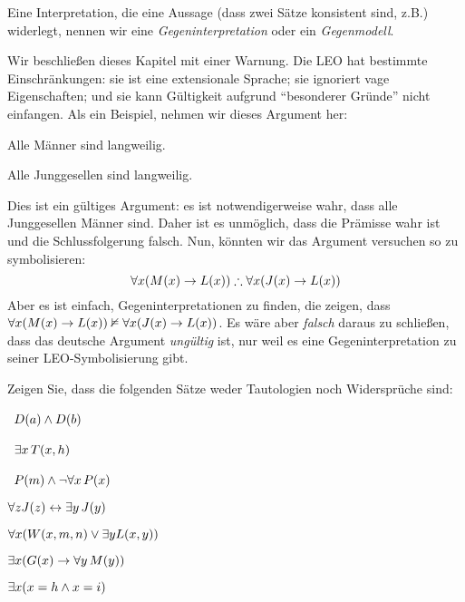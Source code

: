 Eine Interpretation, die eine Aussage (dass zwei Sätze konsistent sind, z.B.\@) widerlegt, nennen wir eine \emph{Gegeninterpretation} oder ein \emph{Gegenmodell}. 

Wir beschlie{\ss}en dieses Kapitel mit einer Warnung. Die LEO hat bestimmte Einschränkungen: sie ist eine extensionale Sprache; sie ignoriert vage Eigenschaften; und sie kann Gültigkeit aufgrund ``besonderer Gründe'' nicht einfangen. Als ein Beispiel, nehmen wir dieses Argument her: 
\begin{earg}
	\item[] Alle Männer sind langweilig.
	\item[\therefore] Alle Junggesellen sind langweilig.
\end{earg}
Dies ist ein gültiges Argument: es ist notwendigerweise wahr, dass alle Junggesellen Männer sind. Daher ist es unmöglich, dass die Prämisse wahr ist und die Schlussfolgerung falsch. Nun, könnten wir das Argument versuchen so zu symbolisieren:
$$\forall x(\atom{M}{x} \eif \atom{L}{x}) \therefore \forall x(\atom{J}{x} \eif  \atom{L}{x})$$
Aber es ist einfach, Gegeninterpretationen zu finden, die zeigen, dass $\forall x(\mathord{M}(x) \rightarrow \mathord{L}(x)) \nvDash \forall x(\mathord{J}(x) \rightarrow  \mathord{L}(x))$. Es wäre aber \emph{falsch} daraus zu schlie{\ss}en, dass das deutsche Argument \emph{ungültig} ist, nur weil es eine Gegeninterpretation zu seiner LEO-Symbolisierung gibt.

\practiceproblems

\problempart
\label{pr.Contingent}
Zeigen Sie, dass die folgenden Sätze weder Tautologien noch Widersprüche sind:
\begin{earg}
\item \leftsolutions\ $\mathord{D}(a)  \wedge \mathord{D}(b)$
\item \leftsolutions\ $\exists x\, \mathord{T}(x,h)$
\item \leftsolutions\ $\mathord{P}(m)  \wedge \neg\forall x\, \mathord{P}(x)$
\item $\forall z \mathord{J}(z) \leftrightarrow \exists y\, \mathord{J}(y)$
\item $\forall x (\mathord{W}(x,m,n) \vee \exists y\mathord{L}(x,y))$
\item $\exists x (\mathord{G}(x) \rightarrow \forall y\, \mathord{M}(y))$
\item $\exists x (x = h \wedge x = i)$
\end{earg}


